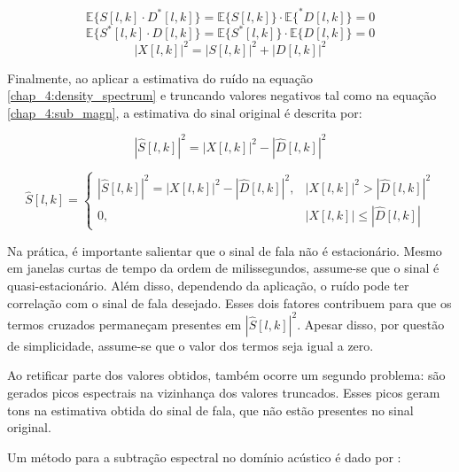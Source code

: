 \begin{equation}
    \mathbb{E}\{S[l, k]\cdot D^*[l,k]\} = \mathbb{E}\{S[l, k]\} \cdot \mathbb{E}\{^*D[l, k]\} = 0
\end{equation}
\begin{equation}
    \mathbb{E}\{S^*[l, k]\cdot D[l,k]\} = \mathbb{E}\{S^*[l, k]\} \cdot \mathbb{E}\{D[l, k]\} = 0
\end{equation}
\begin{equation} \label{chap_4:density_spectrum}
    |X[l, k]|^2 = |S[l, k]|^2 + |D[l, k]|^2
\end{equation}

Finalmente, ao aplicar a estimativa do ruído na equação
\eqref{chap_4:density_spectrum} e truncando valores negativos tal como na
equação \eqref{chap_4:sub_magn}, a estimativa do sinal original é descrita por:

\begin{equation}
    |\hat{S}[l, k]|^2 = |X[l, k]|^2 - |\hat{D}[l, k]|^2
\end{equation}

\begin{equation} \label{chap_4:sub_pow}
    \hat{S}[l, k] =
    \begin{cases}
        |\hat{S}[l, k]|^2 = |X[l, k]|^2 - |\hat{D}[l, k]|^2, & |X[l, k]|^2 > |\hat{D}[l, k]|^2 \\
     0, & |X[l, k]| \leq |\hat{D}[l, k]|
    \end{cases}
\end{equation}

Na prática, é importante salientar que o sinal de fala não é estacionário. Mesmo
em janelas curtas de tempo da ordem de milissegundos, assume-se que o sinal é
quasi-estacionário. Além disso, dependendo da aplicação, o ruído pode ter
correlação com o sinal de fala desejado. Esses dois fatores contribuem para que
os termos cruzados permaneçam presentes em $|\hat{S}[l, k]|^2$. Apesar disso,
por questão de simplicidade, assume-se que o valor dos termos seja igual a zero.

Ao retificar parte dos valores obtidos, também ocorre um segundo problema: são
gerados picos espectrais na vizinhança dos valores truncados. Esses picos geram
tons na estimativa obtida do sinal de fala, que não estão presentes no sinal
original.

Um método para a subtração espectral no domínio acústico é dado por
\cite{zhang2013} \label{berouti1979enhancement}: 

